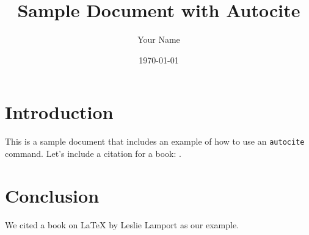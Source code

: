 \documentclass{article}
\begin{document}
\title{Sample Document with Autocite}
\author{Your Name}
\date{\today}
\maketitle

\section{Introduction}

This is a sample document that includes an example of how to use an \texttt{autocite} command. Let’s include a citation for a book: \autocite{doeTestJournal2024}.

\section{Conclusion}

We cited a book on LaTeX by Leslie Lamport as our example.

\printbibliography
\end{document}
